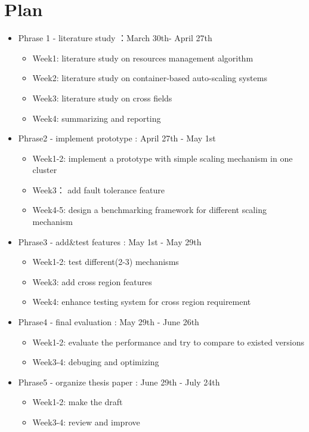\documentclass[sigchi]{acmart}
\begin{document}
\section{Plan}
\begin{itemize}
  \item Phrase 1 - literature study ：March 30th- April 27th
  \begin{itemize}
    \item Week1: literature study on resources management algorithm 
    \item Week2: literature study on container-based auto-scaling systems
    \item Week3: literature study on cross fields
    \item Week4: summarizing and reporting
  \end{itemize}
  \item Phrase2 - implement prototype : April 27th - May 1st
  \begin{itemize}
    \item Week1-2: implement a prototype with simple scaling mechanism in one cluster
    \item Week3： add fault tolerance feature
    \item Week4-5: design a benchmarking framework for different scaling mechanism 
  \end{itemize}
  \item Phrase3 - add&test features : May 1st - May 29th
  \begin{itemize}
    \item Week1-2: test different(2-3) mechanisms
    \item Week3: add cross region features
    \item Week4: enhance testing system for cross region requirement
  \end{itemize}
  \item Phrase4 - final evaluation : May 29th - June 26th
  \begin{itemize}
    \item Week1-2: evaluate the performance and try to compare to existed versions
    \item Week3-4: debuging and optimizing
  \end{itemize}
  \item Phrase5 - organize thesis paper : June 29th - July 24th
  \begin{itemize}
    \item Week1-2: make the draft
    \item Week3-4: review and improve
  \end{itemize}
\end{itemize}
\newpage  


\end{document}
